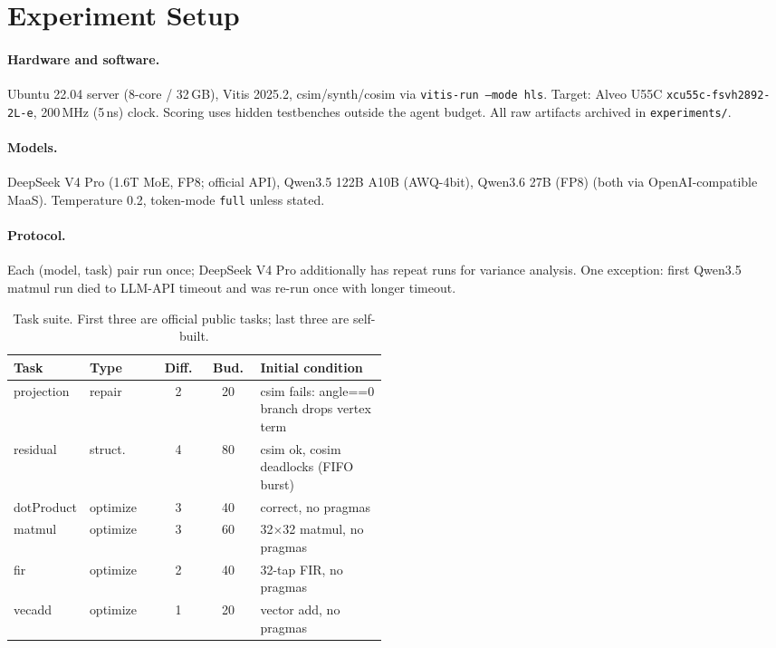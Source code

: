\documentclass[10pt,conference,letterpaper]{IEEEtran}
\begin{document}
\section{Experiment Setup}
\label{app:setup}

\paragraph{Hardware and software.} Ubuntu 22.04 server (8-core / 32\,GB), Vitis 2025.2, csim/synth/cosim via \texttt{vitis-run --mode hls}. Target: Alveo U55C \texttt{xcu55c-fsvh2892-2L-e}, 200\,MHz (5\,ns) clock. Scoring uses hidden testbenches outside the agent budget. All raw artifacts archived in \texttt{experiments/}.

\paragraph{Models.} DeepSeek V4 Pro (1.6T MoE, FP8; official API), Qwen3.5 122B A10B (AWQ-4bit), Qwen3.6 27B (FP8) (both via OpenAI-compatible MaaS). Temperature 0.2, token-mode \texttt{full} unless stated.

\paragraph{Protocol.} Each (model, task) pair run once; DeepSeek V4 Pro additionally has repeat runs for variance analysis. One exception: first Qwen3.5 matmul run died to LLM-API timeout and was re-run once with longer timeout.

\begin{table}[h]
\centering
\caption{Task suite. First three are official public tasks; last three are self-built.}
\label{tab:tasks}
\small
\begin{tabular}{>{\raggedright\arraybackslash}p{0.14\linewidth} l c c p{0.34\linewidth}}
\toprule
\textbf{Task} & \textbf{Type} & \textbf{Diff.} & \textbf{Bud.} & \textbf{Initial condition} \\
\midrule
projection & repair & 2 & 20 & csim fails: angle==0 branch drops vertex term \\
residual & struct. & 4 & 80 & csim ok, cosim deadlocks (FIFO burst) \\
dotProduct & optimize & 3 & 40 & correct, no pragmas \\
matmul & optimize & 3 & 60 & 32$\times$32 matmul, no pragmas \\
fir & optimize & 2 & 40 & 32-tap FIR, no pragmas \\
vecadd & optimize & 1 & 20 & vector add, no pragmas \\
\bottomrule
\end{tabular}
\end{table}
\end{document}
